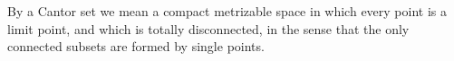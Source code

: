 By a Cantor set we mean a compact metrizable space in which every point is a limit point, and which is totally disconnected, in the sense that the only connected subsets are formed by single points.
